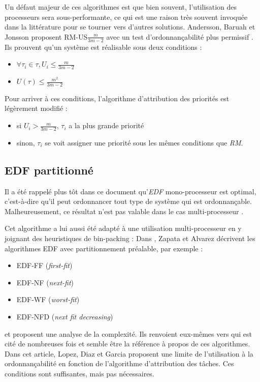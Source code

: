 	Un défaut majeur de ces algorithmes est que bien souvent, l'utilisation des processeurs sera 
	sous-performante, ce qui est une raison très souvent invoquée dans la littérature pour se 
	tourner vers d'autres solutions. 
	Andersson, Baruah et Jonsson proposent RM-US$\frac{m}{3m-2}$ avec un test 
	d'ordonnançabilité plus permissif \cite{andersson_static-priority_2001}. Ils prouvent 
	qu'un système est réalisable sous deux conditions :\medskip
	\begin{itemize}
		\item $\forall \tau_i \in \tau, U_i \leq \frac{m}{3m-2}$
		\item $U(\tau) \leq \frac{m^2}{3m-2}$ 
	\end{itemize}
	\vspace{1em}
	Pour arriver à ces conditions, l'algorithme d'attribution des priorités est légèrement modifié : \medskip
	\begin{itemize}
		\item si $U_i > \frac{m}{3m-2}$, $\tau_i$ a la plus grande priorité
		\item sinon, $\tau_i$ se voit assigner une priorité sous les mêmes conditions que \textit{RM}.
	\end{itemize}
	
	
	\subsection{EDF partitionné}
	Il a été rappelé plus tôt dans ce document qu'\textit{EDF} mono-processeur est optimal, 
	c'est-à-dire qu'il peut ordonnancer tout type de système qui est ordonnançable. 
	Malheureusement, ce résultat n'est pas valable dans le cas multi-processeur \cite{dertouzos_multiprocessor_1989}.\medskip
	
	Cet algorithme a lui aussi été adapté à une utilisation multi-processeur en y joignant 
	des heuristiques de bin-packing : \medskip
	Dans \cite{pereira_zapata_edf_2005}, Zapata et Alvarez décrivent les algorithmes 
	EDF avec partitionnement préalable, par exemple : \medskip
	\begin{itemize}
		\item EDF-FF (\textit{first-fit})
		\item EDF-NF (\textit{next-fit})
		\item EDF-WF (\textit{worst-fit})
		\item EDF-NFD (\textit{next fit decreasing})
	\end{itemize}
	et proposent une analyse de la complexité. Ils renvoient eux-mêmes vers 
	\cite{lopez_utilization_2004} 
	qui est cité de nombreuses fois et semble être la référence à propos de ces algorithmes. 
	Dans cet article, Lopez, Diaz et Garcia proposent une limite de l'utilisation à la 
	ordonnançabilité en fonction de l'algorithme d'attribution des tâches. Ces conditions 
	sont suffisantes, mais pas nécessaires.\medskip
		
